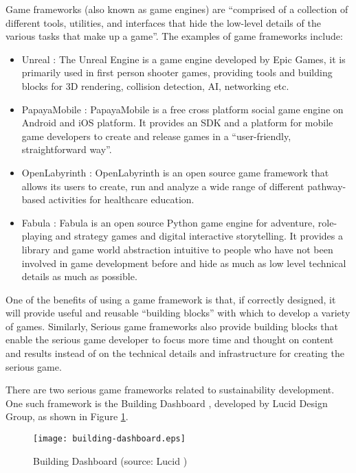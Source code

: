 Game frameworks (also known as game engines) \cite{sherrod2006ultimate} are ``comprised of a collection of different tools, utilities, and interfaces that hide the low-level details of the various tasks that make up a game''. The examples of game frameworks include:
\begin {itemize}
    \item Unreal \cite{unrealengine}:  The Unreal Engine is a game engine developed by Epic Games, it is primarily used in first person shooter games, providing tools and building blocks for 3D rendering, collision detection, AI, networking etc.
    \item PapayaMobile \cite{papayamobile}: PapayaMobile is a free cross platform social game engine on Android and iOS platform. It provides an SDK and a platform for mobile game developers to create and release games in a ``user-friendly, straightforward way''.
    \item OpenLabyrinth \cite{openlabyrinth}: OpenLabyrinth is an open source game framework that allows its users to create, run and analyze a wide range of different pathway-based activities for healthcare education.
    \item Fabula \cite{fabula}: Fabula is an open source Python game engine for adventure, role-playing and strategy games and digital interactive storytelling. It provides a library and game world abstraction intuitive to people who have not been involved in game development before and hide as much as low level technical details as much as possible.
\end {itemize}

One of the benefits of using a game framework is that, if correctly designed, it will provide useful and reusable ``building blocks'' with which to develop a variety of games. Similarly, Serious game frameworks also provide building blocks that enable the serious game developer to focus more time and thought on content and results instead of on the technical details and infrastructure for creating the serious game.

There are two serious game frameworks related to sustainability development. One such framework is the Building Dashboard \cite{building-dashboard}, developed by Lucid Design Group, as shown in Figure \ref{fig:building-dashboard}.

\begin{figure}[htbp]
	\centering
		\texttt{[image: building-dashboard.eps]}
		\caption{Building Dashboard (source: Lucid \cite{building-dashboard})}
		\label{fig:building-dashboard}
\end{figure}

